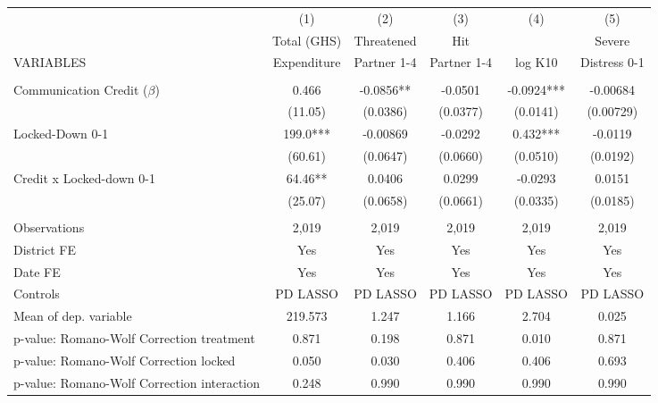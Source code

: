 \begin{tabular}{lccccc} \hline
 & (1) & (2) & (3) & (4) & (5) \\
 & Total (GHS) & Threatened & Hit &  & Severe \\
VARIABLES & Expenditure & Partner 1-4 & Partner 1-4 & log K10 & Distress 0-1 \\ \hline
 &  &  &  &  &  \\
Communication Credit ($\beta$) & 0.466 & -0.0856** & -0.0501 & -0.0924*** & -0.00684 \\
 & (11.05) & (0.0386) & (0.0377) & (0.0141) & (0.00729) \\
Locked-Down 0-1 & 199.0*** & -0.00869 & -0.0292 & 0.432*** & -0.0119 \\
 & (60.61) & (0.0647) & (0.0660) & (0.0510) & (0.0192) \\
Credit x Locked-down 0-1 & 64.46** & 0.0406 & 0.0299 & -0.0293 & 0.0151 \\
 & (25.07) & (0.0658) & (0.0661) & (0.0335) & (0.0185) \\
 &  &  &  &  &  \\
Observations & 2,019 & 2,019 & 2,019 & 2,019 & 2,019 \\
District FE & Yes & Yes & Yes & Yes & Yes \\
Date FE & Yes & Yes & Yes & Yes & Yes \\
Controls & PD LASSO & PD LASSO & PD LASSO & PD LASSO & PD LASSO \\
Mean of dep. variable & 219.573 & 1.247 & 1.166 & 2.704 & 0.025 \\
p-value: Romano-Wolf Correction treatment & 0.871 & 0.198 & 0.871 & 0.010 & 0.871 \\
p-value: Romano-Wolf Correction locked & 0.050 & 0.030 & 0.406 & 0.406 & 0.693 \\
 p-value: Romano-Wolf Correction interaction & 0.248 & 0.990 & 0.990 & 0.990 & 0.990 \\ \hline
\end{tabular}
